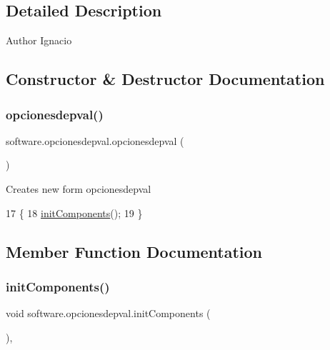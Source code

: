 \subsection{Detailed Description}
\begin{DoxyAuthor}{Author}
Ignacio 
\end{DoxyAuthor}


\subsection{Constructor \& Destructor Documentation}
\mbox{\label{classsoftware_1_1opcionesdepval_aa861d1ccded1cb598792dc481db224c3}} 
\subsubsection{\texorpdfstring{opcionesdepval()}{opcionesdepval()}}
{\footnotesize\ttfamily software.\+opcionesdepval.\+opcionesdepval (\begin{DoxyParamCaption}{ }\end{DoxyParamCaption})\hspace{0.3cm}{\ttfamily [inline]}}

Creates new form opcionesdepval 
\begin{DoxyCode}
17                             \{
18         \mbox{\hyperlink{classsoftware_1_1opcionesdepval_a8d35dd2e1b7f1772acde05d06f031d69}{initComponents}}();
19     \}
\end{DoxyCode}


\subsection{Member Function Documentation}
\mbox{\label{classsoftware_1_1opcionesdepval_a8d35dd2e1b7f1772acde05d06f031d69}} 
\subsubsection{\texorpdfstring{init\+Components()}{initComponents()}}
{\footnotesize\ttfamily void software.\+opcionesdepval.\+init\+Components (\begin{DoxyParamCaption}{ }\end{DoxyParamCaption})\hspace{0.3cm}{\ttfamily [inline]}, {\ttfamily [private]}}

